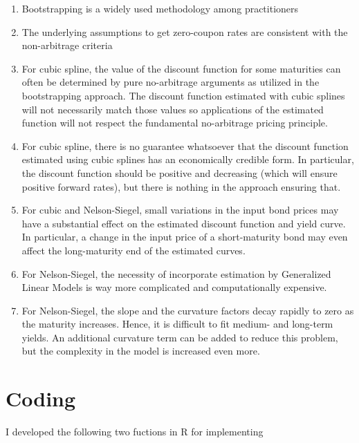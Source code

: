 \documentclass[letterpaper,10pt,english]{/anaconda/lib/python2.7/site-packages/sphinx/texinputs/sphinxhowto}
\begin{document}
\begin{enumerate}
\def\labelenumi{\arabic{enumi}.}
\itemsep1pt\parskip0pt
\item
  Bootstrapping is a widely used methodology among practitioners
\item
  The underlying assumptions to get zero-coupon rates are consistent
  with the non-arbitrage criteria
\item
  For cubic spline, the value of the discount function for some
  maturities can often be determined by pure no-arbitrage arguments as
  utilized in the bootstrapping approach. The discount function
  estimated with cubic splines will not necessarily match those values
  so applications of the estimated function will not respect the
  fundamental no-arbitrage pricing principle.
\item
  For cubic spline, there is no guarantee whatsoever that the discount
  function estimated using cubic splines has an economically credible
  form. In particular, the discount function should be positive and
  decreasing (which will ensure positive forward rates), but there is
  nothing in the approach ensuring that.
\item
  For cubic and Nelson-Siegel, small variations in the input bond prices
  may have a substantial effect on the estimated discount function and
  yield curve. In particular, a change in the input price of a
  short-maturity bond may even affect the long-maturity end of the
  estimated curves.
\item
  For Nelson-Siegel, the necessity of incorporate estimation by
  Generalized Linear Models is way more complicated and computationally
  expensive.
\item
  For Nelson-Siegel, the slope and the curvature factors decay rapidly
  to zero as the maturity increases. Hence, it is difficult to fit
  medium- and long-term yields. An additional curvature term can be
  added to reduce this problem, but the complexity in the model is
  increased even more.
\end{enumerate}\section{Coding}I developed the following two fuctions in R for implementing
\end{document}
